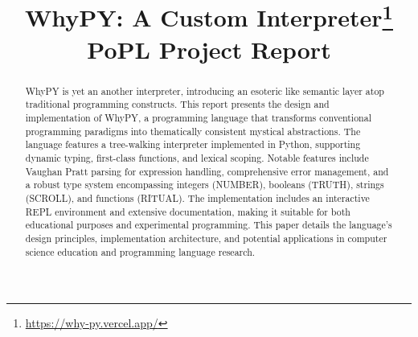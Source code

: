 \documentclass[conference]{IEEEtran}
\begin{document}

\title{WhyPY: A Custom Interpreter\thanks{\url{https://why-py.vercel.app/}} \\ \Large{PoPL Project Report}}

\author{
  \and
}

\maketitle

\begin{abstract}
WhyPY is yet an another interpreter, introducing an esoteric like semantic layer atop traditional programming constructs. This report presents the design and implementation of WhyPY, a programming language that transforms conventional programming paradigms into thematically consistent mystical abstractions. The language features a tree-walking interpreter implemented in Python, supporting dynamic typing, first-class functions, and lexical scoping. Notable features include Vaughan Pratt parsing for expression handling, comprehensive error management, and a robust type system encompassing integers (NUMBER), booleans (TRUTH), strings (SCROLL), and functions (RITUAL). The implementation includes an interactive REPL environment and extensive documentation, making it suitable for both educational purposes and experimental programming. This paper details the language's design principles, implementation architecture, and potential applications in computer science education and programming language research.
\end{abstract}
\end{document}
